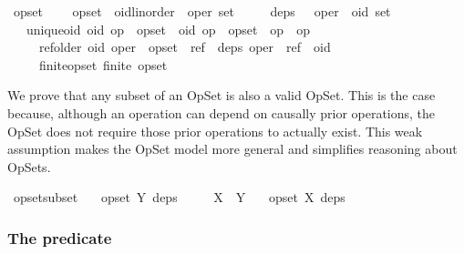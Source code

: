 \begin{isabelle}
\isamarkupfalse%
\ opset\ {\isacharequal}\isanewline
\ \ \ opset\ {\isacharcolon}{\isacharcolon}\ {\isachardoublequoteopen}{\isacharparenleft}{\isacharprime}oid{\isacharcolon}{\isacharcolon}{\isacharbraceleft}linorder{\isacharbraceright}\ {\isasymtimes}\ {\isacharprime}oper{\isacharparenright}\ set{\isachardoublequoteclose}\isanewline
\ \ \ \ \ deps\ \ {\isacharcolon}{\isacharcolon}\ {\isachardoublequoteopen}{\isacharprime}oper\ {\isasymRightarrow}\ {\isacharprime}oid\ set{\isachardoublequoteclose}\isanewline
\ \ \ unique{\isacharunderscore}oid{\isacharcolon}\ {\isachardoublequoteopen}{\isacharparenleft}oid{\isacharcomma}\ op{}{\isacharparenright}\ {\isasymin}\ opset\ {\isasymLongrightarrow}\ {\isacharparenleft}oid{\isacharcomma}\ op{}{\isacharparenright}\ {\isasymin}\ opset\ {\isasymLongrightarrow}\ op{}\ {\isacharequal}\ op{}{\isachardoublequoteclose}\isanewline
\ \ \ \ \ ref{\isacharunderscore}older{\isacharcolon}\ {\isachardoublequoteopen}{\isacharparenleft}oid{\isacharcomma}\ oper{\isacharparenright}\ {\isasymin}\ opset\ {\isasymLongrightarrow}\ ref\ {\isasymin}\ deps\ oper\ {\isasymLongrightarrow}\ ref\ {\isacharless}\ oid{\isachardoublequoteclose}\isanewline
\ \ \ \ \ finite{\isacharunderscore}opset{\isacharcolon}\ {\isachardoublequoteopen}finite\ opset{\isachardoublequoteclose}%
\end{isabelle}

We prove that any subset of an OpSet is also a valid OpSet.
This is the case because, although an operation can depend on causally prior operations, the OpSet does not require those prior operations to actually exist.
This weak assumption makes the OpSet model more general and simplifies reasoning about OpSets.
\begin{isabelle}
\isamarkupfalse%
\ opset{\isacharunderscore}subset{\isacharcolon}\isanewline
\ \ \ {\isachardoublequoteopen}opset\ Y\ deps{\isachardoublequoteclose}\isanewline
\ \ \ \ \ {\isachardoublequoteopen}X\ {\isasymsubseteq}\ Y{\isachardoublequoteclose}\isanewline
\ \ \ {\isachardoublequoteopen}opset\ X\ deps{\isachardoublequoteclose}
\end{isabelle}

\subsubsection{The  predicate}


